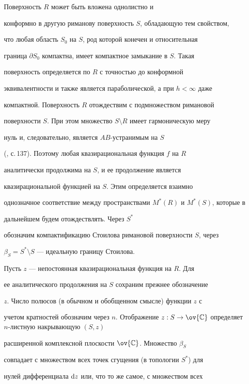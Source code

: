 \begin{pf} Поверхность $R$ может быть вложена однолистно и


конформно в другую риманову поверхность $S$, обладающую тем свойством,


что любая область $S_0$ на $S$, род которой конечен и относительная


граница $\partial S_0$ компактна, имеет компактное замыкание в $S$. Такая


поверхность определяется по $R$ с точностью до конформной


эквивалентности и также является параболической, а при $h<\infty$ даже


компактной. Поверхность $R$ отождествим с подмножеством римановой


поверхности $S$. При этом множество $S\setminus R$ имеет гармоническую меру


нуль и, следовательно, является $AB$-устранимым на $S$


(\cite{S-N}, с.\,137). Поэтому любая квазирациональная функция $f$ на $R$


аналитически продолжима на $S$, и ее продолжение является


квазирациональной функцией на $S$. Этим определяется взаимно


однозначное соответствие между пространствами $M^*(R)$ и $M^*(S)$, которые в


дальнейшем будем отождествлять. Через $S^*$


обозначим компактификацию Стоилова римановой поверхности $S$, через


$\beta_S = S^*\setminus S$ --- идеальную границу Стоилова.





Пусть $z$ --- непостоянная квазирациональная функция на $R$. Для


ее аналитического продолжения на $S$ сохраним прежнее обозначение


$z$. Число полюсов (в обычном и обобщенном смысле) функции $z$ с


учетом кратностей обозначим через $n$. Отображение $z: S\to


\ov{\Bbb C}$ определяет $n$-листную накрывающую $(S,z)$


расширенной комплексной плоскости $\ov{\Bbb C}$. Множество $\beta_S$


совпадает с множеством всех точек сгущения (в топологии $S^*$) для


нулей дифференциала $\mathrm d z$ или, что то же самое, с множеством всех



\end{pf}

